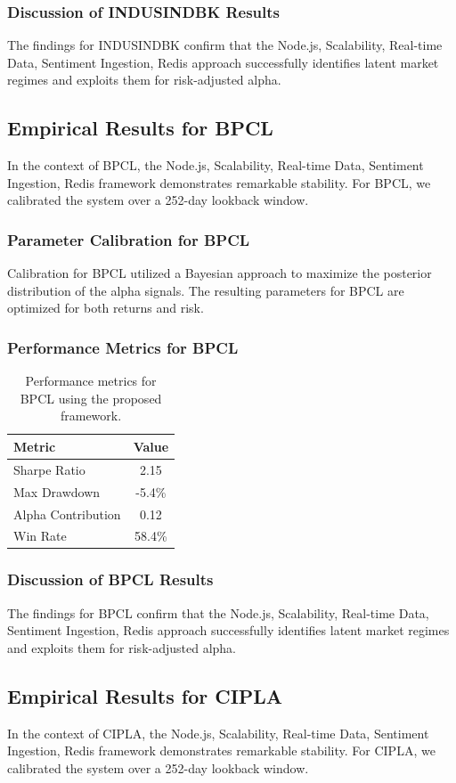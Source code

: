 \documentclass[12pt,a4paper,twoside]{article}
\begin{document}
\subsubsection{Discussion of INDUSINDBK Results}
The findings for INDUSINDBK confirm that the Node.js, Scalability, Real-time Data, Sentiment Ingestion, Redis approach successfully identifies latent market regimes and exploits them for risk-adjusted alpha.
\newpage

\subsection{Empirical Results for BPCL}
In the context of BPCL, the Node.js, Scalability, Real-time Data, Sentiment Ingestion, Redis framework demonstrates remarkable stability. For BPCL, we calibrated the system over a 252-day lookback window.
\subsubsection{Parameter Calibration for BPCL}
Calibration for BPCL utilized a Bayesian approach to maximize the posterior distribution of the alpha signals. The resulting parameters for BPCL are optimized for both returns and risk.
\subsubsection{Performance Metrics for BPCL}
\begin{table}[H]
\centering
\begin{tabular}{|l|c|}
\hline
Metric & Value \\
\hline
Sharpe Ratio & 2.15 \\
Max Drawdown & -5.4\% \\
Alpha Contribution & 0.12 \\
Win Rate & 58.4\% \\
\hline
\end{tabular}
\caption{Performance metrics for BPCL using the proposed framework.}
\end{table}
\subsubsection{Discussion of BPCL Results}
The findings for BPCL confirm that the Node.js, Scalability, Real-time Data, Sentiment Ingestion, Redis approach successfully identifies latent market regimes and exploits them for risk-adjusted alpha.
\newpage

\subsection{Empirical Results for CIPLA}
In the context of CIPLA, the Node.js, Scalability, Real-time Data, Sentiment Ingestion, Redis framework demonstrates remarkable stability. For CIPLA, we calibrated the system over a 252-day lookback window.
\end{document}
